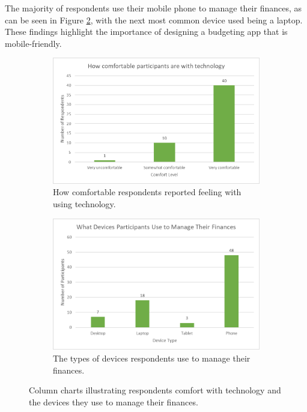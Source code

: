 \documentclass{l4proj}
\begin{document}
\begin{appendices}
The majority of respondents use their mobile phone to manage their finances, as can be seen in Figure \ref{fig:devices}, with the next most common device used being a laptop. These findings highlight the importance of designing a budgeting app that is mobile-friendly.

\begin{figure}[htb] 
    \centering
    \begin{subfigure}[b]{0.47\textwidth}
        \centering
        \includegraphics[width=\linewidth]{images/User-Survey/user-survey-charts-comfort-tech.png}
        \caption{How comfortable respondents reported feeling with using technology.}
        \label{fig:comfort-tech}
    \end{subfigure}
    \begin{subfigure}[b]{0.45\textwidth}
        \centering
        \includegraphics[width=\linewidth]{images/User-Survey/user-survey-charts-devices.png}
        \caption{The types of devices respondents use to manage their finances.}
        \label{fig:devices}
    \end{subfigure}
    \caption{Column charts illustrating respondents comfort with technology and the devices they use to manage their finances.}
    \label{fig:comf-devices-charts}
\end{figure}


\end{appendices}
\end{document}
